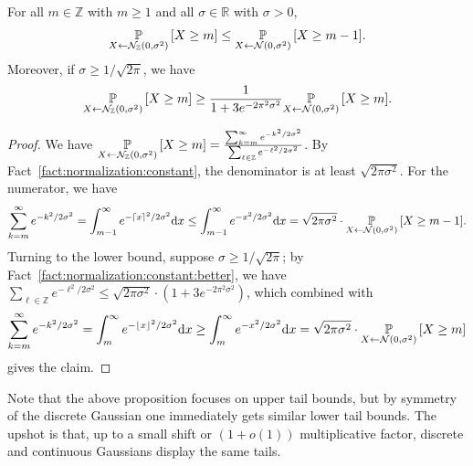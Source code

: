 \documentclass{jpc}
\newcommand{\dgausss}[2]{{\discN\left(#1,#2\right)}}
\newcommand{\dgauss}[1]{\dgausss{0}{#1}}
\newcommand{\pr}[2]{{\ifx&#1& \mathbb{P} \else
\underset{#1}{\mathbb{P}} \fi \left[#2\right]}}
\newcommand{\dx}[1][x]{\mathrm{d}#1}
\newcommand{\Z}{\mathbb{Z}}
\newcommand{\R}{\mathbb{R}}
\begin{document}
\begin{prop}\label{prop:tail:bound:gaussian}
For all $m \in \Z$ with $m \ge 1$ and all $\sigma \in \R$ with $\sigma>0$, 
\begin{equation}
    \pr{X \gets \dgauss{\sigma^2}}{X \ge m} \le \pr{X \gets \mathcal{N}(0,\sigma^2)}{X \ge m-1}.
\end{equation}
Moreover, if $\sigma \geq 1/\sqrt{2\pi}$, we have
\begin{equation}
    \pr{X \gets \dgauss{\sigma^2}}{X \ge m} \ge \frac{1}{1+3e^{-2\pi^2\sigma^2}}\pr{X \gets \mathcal{N}(0,\sigma^2)}{X \ge m}.
\end{equation}
\end{prop}
\begin{proof}
We have $\pr{X \gets \dgauss{\sigma^2}}{X \ge m} = \frac{\sum_{k=m}^\infty e^{-k^2/2\sigma^2}}{\sum_{\ell\in \Z} e^{-\ell^2/2\sigma^2}}$. 
By Fact~\ref{fact:normalization:constant}, the denominator is at least $\sqrt{2\pi\sigma^2}$.
For the numerator, we have 
\[
    \sum_{k=m}^\infty e^{-k^2/2\sigma^2} 
    = \int_{m-1}^\infty e^{-\lceil x \rceil^2/2\sigma^2} \dx 
    \le \int_{m-1}^\infty e^{-x^2/2\sigma^2}\dx 
    = \sqrt{2\pi\sigma^2}\cdot\pr{X \gets \mathcal{N}(0,\sigma^2)}{X \ge m-1}.
\]
Turning to the lower bound, suppose $\sigma \geq 1/\sqrt{2\pi}$; by Fact~\ref{fact:normalization:constant:better}, we have $\sum_{\ell\in \Z} e^{-\ell^2/2\sigma^2}\leq \sqrt{2\pi\sigma^2}\cdot(1+3e^{-2\pi^2\sigma^2})$, which combined with
\[
    \sum_{k=m}^\infty e^{-k^2/2\sigma^2} 
    = \int_{m}^\infty e^{-\lfloor x \rfloor^2/2\sigma^2} \dx 
    \ge \int_{m}^\infty e^{-x^2/2\sigma^2}\dx 
    = \sqrt{2\pi\sigma^2}\cdot\pr{X \gets \mathcal{N}(0,\sigma^2)}{X \ge m}
\]
gives the claim.
\end{proof}
Note that the above proposition focuses on upper tail bounds, but by symmetry of the discrete Gaussian one immediately gets similar lower tail bounds. The upshot is that, up to a small shift or $(1+o(1))$ multiplicative factor, discrete and continuous Gaussians display the same tails.
\end{document}
